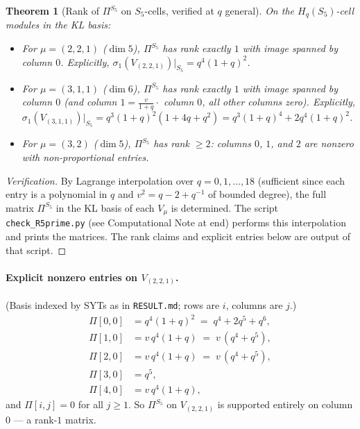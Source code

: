 \documentclass[11pt]{article}
\newtheorem{theorem}{Theorem}
\theoremstyle{definition}
\begin{document}
\begin{theorem}[Rank of $\Pi^{S_5}$ on $S_5$-cells, verified at $q$ general]\label{thm:rank1}
On the $H_q(S_5)$-cell modules in the KL basis:
\begin{itemize}[leftmargin=2em,topsep=0.3em,itemsep=0.2em]
\item For $\mu = (2,2,1)$ ($\dim 5$), $\Pi^{S_5}$ has rank exactly $1$ with image spanned by column $0$. Explicitly, $\sigma_1(V_{(2,2,1)})|_{S_5} = q^4(1+q)^2$.
\item For $\mu = (3,1,1)$ ($\dim 6$), $\Pi^{S_5}$ has rank exactly $1$ with image spanned by column $0$ (and column $1 = \tfrac{v}{1+q} \cdot$ column $0$, all other columns zero). Explicitly, $\sigma_1(V_{(3,1,1)})|_{S_5} = q^3(1+q)^2(1+4q+q^2) = q^3(1+q)^4 + 2q^4(1+q)^2$.
\item For $\mu = (3,2)$ ($\dim 5$), $\Pi^{S_5}$ has rank $\geq 2$: columns $0$, $1$, and $2$ are nonzero with non-proportional entries.
\end{itemize}
\end{theorem}

\begin{proof}[Verification]
By Lagrange interpolation over $q = 0, 1, \ldots, 18$ (sufficient since each entry is a polynomial in $q$ and $v^2 = q-2+q^{-1}$ of bounded degree), the full matrix $\Pi^{S_5}$ in the KL basis of each $V_\mu$ is determined. The script \texttt{check\_R5prime.py} (see Computational Note at end) performs this interpolation and prints the matrices. The rank claims and explicit entries below are output of that script.
\end{proof}

\paragraph{Explicit nonzero entries on $V_{(2,2,1)}$.} (Basis indexed by SYTs as in \texttt{RESULT.md}; rows are $i$, columns are $j$.)
\begin{align*}
\Pi[0,0] &= q^4(1+q)^2 \;=\; q^4 + 2q^5 + q^6, \\
\Pi[1,0] &= v\,q^4(1+q) \;=\; v\,(q^4 + q^5), \\
\Pi[2,0] &= v\,q^4(1+q) \;=\; v\,(q^4 + q^5), \\
\Pi[3,0] &= q^5, \\
\Pi[4,0] &= v\,q^4(1+q),
\end{align*}
and $\Pi[i,j] = 0$ for all $j \geq 1$. So $\Pi^{S_5}$ on $V_{(2,2,1)}$ is supported entirely on column $0$ — a rank-$1$ matrix.
\end{document}
